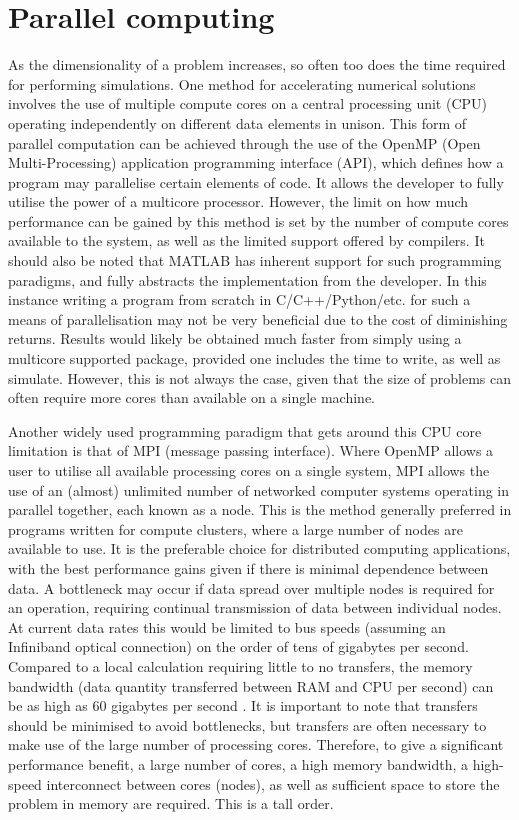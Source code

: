 \section{Parallel computing}

As the dimensionality of a problem increases, so often too does the time required for performing simulations. One method for accelerating numerical solutions involves the use of multiple compute cores on a central processing unit (CPU) operating independently on different data elements in unison. This form of parallel computation can be achieved through the use of the OpenMP (Open Multi-Processing) application programming interface (API), which defines how a program may parallelise certain elements of code. It allows the developer to fully utilise the power of a multicore processor. However, the limit on how much performance can be gained by this method is set by the number of compute cores available to the system, as well as the limited support offered by compilers. It should also be noted that \textsc{MATLAB} has inherent support for such programming paradigms, and fully abstracts the implementation from the developer. In this instance writing a program from scratch in C/C++/Python/etc. for such a means of parallelisation may not be very beneficial due to the cost of diminishing returns. Results would likely be obtained much faster from simply using a multicore supported package, provided one includes the time to write, as well as simulate. However, this is not always the case, given that the size of problems can often require more cores than available on a single machine.

Another widely used programming paradigm that gets around this CPU core limitation is that of MPI (message passing interface). Where OpenMP allows a user to utilise all available processing cores on a single system, MPI allows the use of an (almost) unlimited number of networked computer systems operating in parallel together, each known as a node. This is the method generally preferred in programs written for compute clusters, where a large number of nodes are available to use. It is the preferable choice for distributed computing applications, with the best performance gains given if there is minimal dependence between data. A bottleneck may occur if data spread over multiple nodes is required for an operation, requiring continual transmission of data between individual nodes. At current data rates this would be limited to bus speeds (assuming an Infiniband optical connection) on the order of tens of gigabytes per second. Compared to a local calculation requiring little to no transfers, the memory bandwidth (data quantity transferred between RAM and CPU per second) can be as high as 60 gigabytes per second \cite{DAT:Intel_xeon}. It is important to note that transfers should be minimised to avoid bottlenecks, but transfers are often necessary to make use of the large number of processing cores. Therefore, to give a significant performance benefit, a large number of cores, a high memory bandwidth, a high-speed interconnect between cores (nodes), as well as sufficient space to store the problem in memory are required. This is a tall order.

